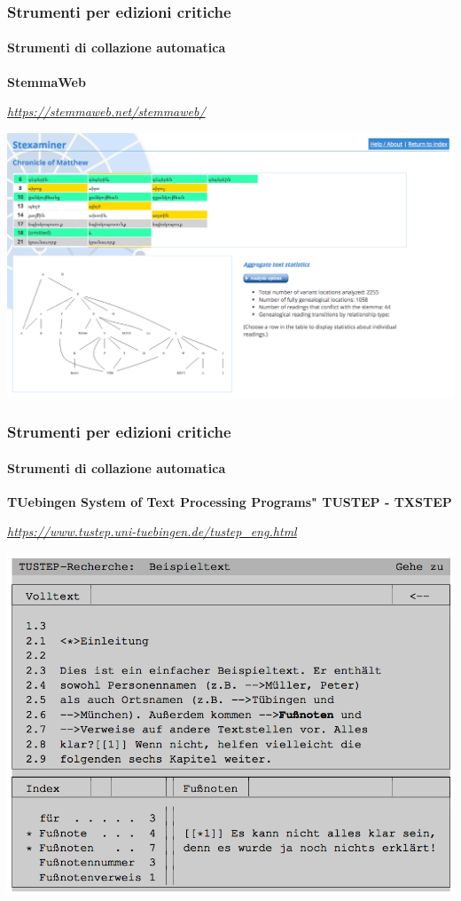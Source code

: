 \begin{frame}
    \frametitle{Strumenti per edizioni critiche}
    \framesubtitle{Strumenti di collazione automatica}
	\addtocounter{nframe}{1}
    \begin{center}
        \textbf{StemmaWeb}
    \end{center}
    \begin{center}
        \textit{\url{https://stemmaweb.net/stemmaweb/}}
	\end{center}
    \begin{center}
        \includegraphics[width=.95\textwidth]{imgs/stemmaweb.png}
	\end{center}
\end{frame}

\begin{frame}
    \frametitle{Strumenti per edizioni critiche}
    \framesubtitle{Strumenti di collazione automatica}
	\addtocounter{nframe}{1}
    \begin{center}
        \textbf{TUebingen System of Text Processing Programs" TUSTEP - TXSTEP}
    \end{center}
    \begin{center}
        \textit{\url{https://www.tustep.uni-tuebingen.de/tustep_eng.html}}
	\end{center}
    \begin{center}
        \includegraphics[width=.95\textwidth]{imgs/tustep.png}
	\end{center}
\end{frame}

